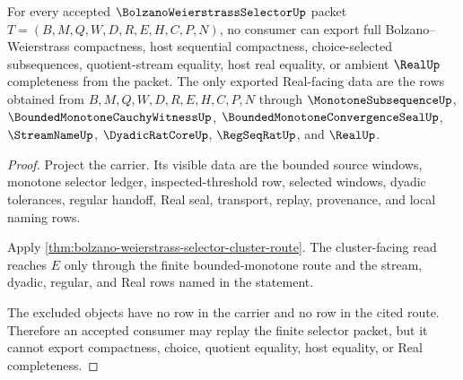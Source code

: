 \begin{theorem}
\label{thm:bolzano-weierstrass-selector-nonescape}
For every accepted $\BolzanoWeierstrassSelectorUp$ packet $T=(B,M,Q,W,D,R,E,H,C,P,N)$, no consumer can export full Bolzano--Weierstrass compactness, host sequential compactness, choice-selected subsequences, quotient-stream equality, host real equality, or ambient $\RealUp$ completeness from the packet. The only exported Real-facing data are the rows obtained from $B,M,Q,W,D,R,E,H,C,P,N$ through $\MonotoneSubsequenceUp$, $\BoundedMonotoneCauchyWitnessUp$, $\BoundedMonotoneConvergenceSealUp$, $\StreamNameUp$, $\DyadicRatCoreUp$, $\RegSeqRatUp$, and $\RealUp$.
\end{theorem}
\begin{proof}
Project the carrier. Its visible data are the bounded source windows, monotone selector ledger, inspected-threshold row, selected windows, dyadic tolerances, regular handoff, Real seal, transport, replay, provenance, and local naming rows.

Apply \autoref{thm:bolzano-weierstrass-selector-cluster-route}. The cluster-facing read reaches $E$ only through the finite bounded-monotone route and the stream, dyadic, regular, and Real rows named in the statement.

The excluded objects have no row in the carrier and no row in the cited route. Therefore an accepted consumer may replay the finite selector packet, but it cannot export compactness, choice, quotient equality, host equality, or Real completeness.
\end{proof}

